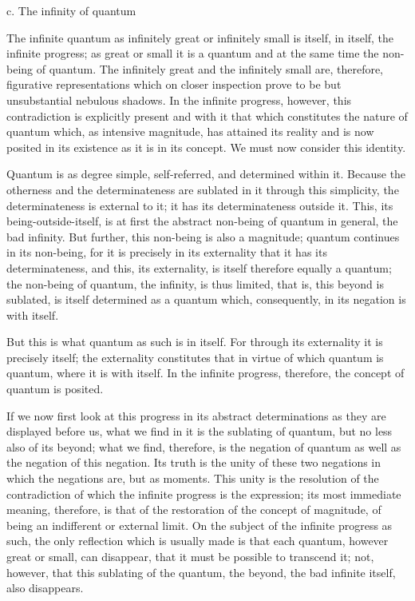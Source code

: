 c. The infinity of quantum

The infinite quantum as infinitely great or infinitely small is
itself, in itself, the infinite progress;
as great or small it is a quantum
and at the same time the non-being of quantum.
The infinitely great and the infinitely small are,
therefore, figurative representations
which on closer inspection prove to be
but unsubstantial nebulous shadows.
In the infinite progress, however,
this contradiction is explicitly present
and with it that which constitutes the nature of quantum
which, as intensive magnitude, has attained its reality
and is now posited in its existence as it is in its concept.
We must now consider this identity.

Quantum is as degree simple, self-referred, and determined within it.
Because the otherness and the determinateness are sublated
in it through this simplicity, the determinateness is external to it;
it has its determinateness outside it.
This, its being-outside-itself,
is at first the abstract non-being
of quantum in general, the bad infinity.
But further, this non-being is also a magnitude;
quantum continues in its non-being,
for it is precisely in its externality
that it has its determinateness,
and this, its externality, is
itself therefore equally a quantum;
the non-being of quantum, the infinity,
is thus limited, that is, this beyond is sublated,
is itself determined as a quantum
which, consequently, in its negation is with itself.

But this is what quantum as such is in itself.
For through its externality it is precisely itself;
the externality constitutes that
in virtue of which quantum is quantum,
where it is with itself.
In the infinite progress, therefore,
the concept of quantum is posited.

If we now first look at this progress
in its abstract determinations as
they are displayed before us,
what we find in it is the sublating of quantum,
but no less also of its beyond;
what we find, therefore, is the negation of
quantum as well as the negation of this negation.
Its truth is the unity of these two negations
in which the negations are, but as moments.
This unity is the resolution of the contradiction
of which the infinite progress is the expression;
its most immediate meaning, therefore, is that
of the restoration of the concept of magnitude,
of being an indifferent or external limit.
On the subject of the infinite progress as such,
the only reflection which is usually made is
that each quantum, however great or small, can disappear,
that it must be possible to transcend it;
not, however, that this sublating of the quantum,
the beyond, the bad infinite itself, also disappears.

